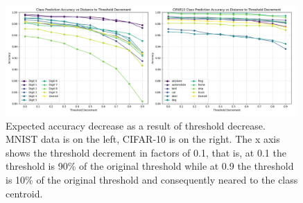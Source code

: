 
\begin{figure}[ht]
    \centering
    \includegraphics[width=0.99\textwidth]{Figures/Combined_CIFAR10_MNIST_single_plot_accuracy_decrements.png}
    \caption{Expected accuracy decrease as a result of threshold decrease. MNIST data is on the left, CIFAR-10 is on the right. The x axis shows the threshold decrement in factors of 0.1, that is, at 0.1 the threshold is 90\% of the original threshold while at 0.9 the threshold is 10\% of the original threshold and consequently neared to the class centroid.}
\label{fig:Combined_CIFAR10_MNIST_single_plot_accuracy_decrements.png}
\end{figure}